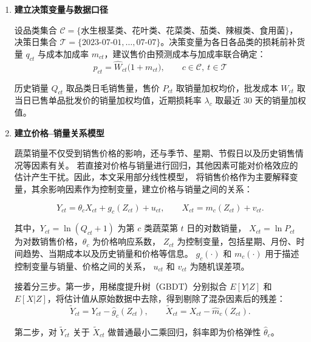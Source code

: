 \documentclass[withoutpreface,bwprint]{cumcmthesis} %
\numberwithin{equation}{section}
\begin{document}
\begin{enumerate}

    \item \textbf{建立决策变量与数据口径}

\hspace*{2em}设品类集合 $\mathcal{C}=\{$水生根茎类、花叶类、花菜类、茄类、辣椒类、食用菌$\}$，决策日集合 $\mathcal{T}=\{2023\text{-}07\text{-}01,\ldots,07\text{-}07\}$。决策变量为各日各品类的损耗前补货量 $q_{ct}$ 与成本加成率 $m_{ct}$，建议售价由预测成本与加成率联合确定：
\begin{equation}
    p_{ct} = \hat{W}_{ct}\big(1+m_{ct}\big),\qquad c\in\mathcal{C},\ t\in\mathcal{T}
\end{equation}

历史销量 $Q_{ct}$ 取品类日毛销售量，售价 $P_{ct}$ 取销量加权均价，批发成本 $W_{ct}$ 取当日已售单品批发价的销量加权均值，近期损耗率 $\lambda_c$ 取最近 30 天的销量加权值。

   \item \textbf{建立价格--销量关系模型}

\hspace*{2em}蔬菜销量不仅受到销售价格的影响，还与季节、星期、节假日以及历史销售情况等因素有关。
若直接对价格与销量进行回归，其他因素可能对价格效应的估计产生干扰。因此，本文采用部分线性模型，
将销售价格作为主要解释变量，其余影响因素作为控制变量，建立价格与销量之间的关系：

\begin{equation}
    Y_{ct}=\theta_c X_{ct}+g_c(Z_{ct})+u_{ct},
    \qquad
    X_{ct}=m_c(Z_{ct})+v_{ct}.
\end{equation}

其中，$Y_{ct}=\ln(Q_{ct}+1)$ 为第 $c$ 类蔬菜第 $t$ 日的对数销量，
$X_{ct}=\ln P_{ct}$ 为对数销售价格，$\theta_c$ 为价格响应系数，
$Z_{ct}$ 为控制变量，包括星期、月份、时间趋势、当期成本以及历史销量和价格等信息。
$g_c(\cdot)$ 和 $m_c(\cdot)$ 用于描述控制变量与销量、价格之间的关系，
$u_{ct}$ 和 $v_{ct}$ 为随机误差项。


\hspace*{2em}接着分三步。第一步，用梯度提升树（GBDT）分别拟合 ${E}[Y|Z]$ 和 ${E}[X|Z]$，将估计值从原始数据中去除，得到剔除了混杂因素后的残差：
\begin{equation}
    \tilde{Y}_{ct} = Y_{ct} - \hat{g}_c(Z_{ct}), \qquad \tilde{X}_{ct} = X_{ct} - \hat{m}_c(Z_{ct}).
\end{equation}

\hspace*{2em}第二步，对 $\tilde{Y}_{ct}$ 关于 $\tilde{X}_{ct}$ 做普通最小二乘回归，斜率即为价格弹性 $\hat{\theta}_c$。


\end{enumerate}
\end{document}

